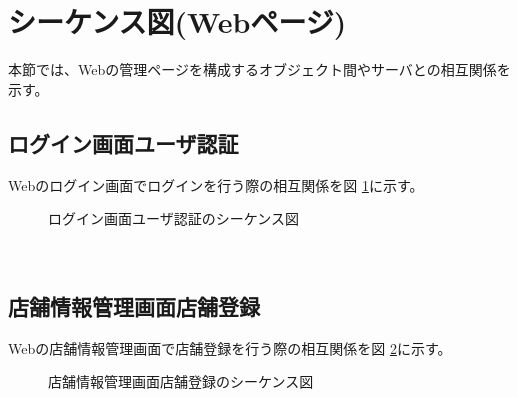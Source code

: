 \documentclass[a4j]{jarticle}
\begin{document}
\section{シーケンス図(Webページ)}
本節では、Webの管理ページを構成するオブジェクト間やサーバとの相互関係を示す。

\subsection{ログイン画面ユーザ認証}
Webのログイン画面でログインを行う際の相互関係を図 \ref {tab:oonishi1}に示す。
\begin{figure}[hb]
\begin{center}
\caption{ログイン画面ユーザ認証のシーケンス図}
\label{tab:oonishi1}
\end{center}
\end{figure}　　
\subsection{店舗情報管理画面店舗登録}
Webの店舗情報管理画面で店舗登録を行う際の相互関係を図 \ref {tab:oonishi2}に示す。
\begin{figure}[hb]
\begin{center}
\caption{店舗情報管理画面店舗登録のシーケンス図}
\label {tab:oonishi2}
\end{center}
\end{figure}
\end{document}
